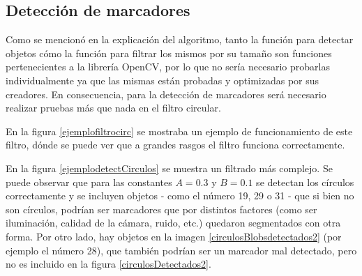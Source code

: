 \subsection{Detección de marcadores}

Como se mencionó en la explicación del algoritmo, tanto la función para detectar objetos cómo la función para filtrar los mismos por su tamaño son funciones pertenecientes a la librería OpenCV, por lo que no sería necesario probarlas individualmente ya que las mismas están probadas y optimizadas por sus creadores. En consecuencia, para la detección de marcadores será necesario realizar pruebas más que nada en el filtro circular.

En la figura \ref{ejemplofiltrocirc} se mostraba un ejemplo de funcionamiento de este filtro, dónde se puede ver que a grandes rasgos el filtro funciona correctamente. 

En la figura \ref{ejemplodetectCirculos} se muestra un filtrado más complejo. Se puede observar que para las constantes $A=0.3$ y $B=0.1$ se detectan los círculos correctamente y se incluyen objetos - como el número 19, 29 o 31 - que si bien no son círculos, podrían ser marcadores que por distintos factores (como ser iluminación, calidad de la cámara, ruido, etc.) quedaron segmentados con otra forma. Por otro lado, hay objetos en la imagen \ref{circulosBlobsdetectados2} (por ejemplo el número 28), que también podrían ser un marcador mal detectado, pero no es incluido en la figura \ref{circulosDetectados2}.


